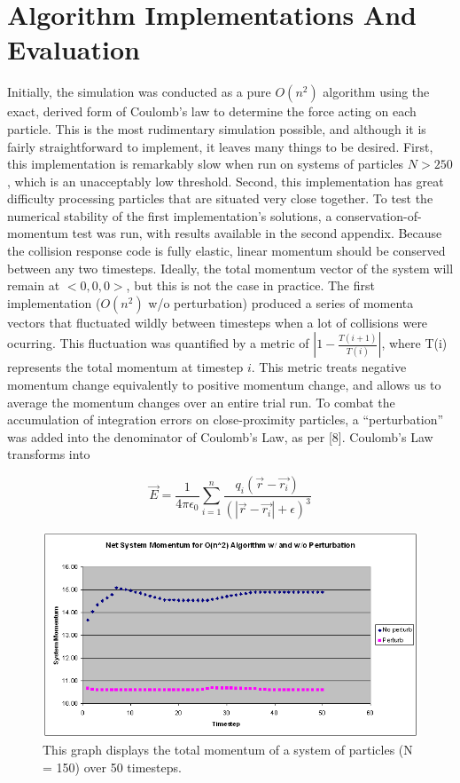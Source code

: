 \documentclass[10pt]{article}
\begin{document}
\section{Algorithm Implementations And Evaluation}
Initially, the simulation was conducted as a pure $O(n^2)$ algorithm using the exact, derived form of Coulomb's law to determine the force acting on each particle. This is the most rudimentary simulation possible, and although it is fairly straightforward to implement, it leaves many things to be desired. First, this implementation is remarkably slow when run on systems of particles $N > 250$, which is an unacceptably low threshold. Second, this implementation has great difficulty processing particles that are situated very close together. To test the numerical stability of the first implementation's solutions, a conservation-of-momentum test was run, with results available in the second appendix. Because the collision response code is fully elastic, linear momentum should be conserved between any two timesteps. Ideally, the total momentum vector of the system will remain at $<0, 0, 0>$, but this is not the case in practice. The first implementation ($O(n^2)$ w/o perturbation) produced a series of momenta vectors that fluctuated wildly between timesteps when a lot of collisions were ocurring. This fluctuation was quantified by a metric of $|1 - \frac{T(i+1)}{T(i)}|$, where T(i) represents the total momentum at timestep $i$. This metric treats negative momentum change equivalently to positive momentum change, and allows us to average the momentum changes over an entire trial run. To combat the accumulation of integration errors on close-proximity particles, a ``perturbation'' was added into the denominator of Coulomb's Law, as per [8]. Coulomb's Law transforms into

$$\vec{E} = \frac{1}{4\pi\epsilon_0}\sum_{i = 1}^n \frac{q_i (\vec{r} - \vec{r_i})}{(|\vec{r} - \vec{r_i}| + \epsilon)^3}$$ 

\begin{figure}[ht]
	\centering
		\includegraphics[scale = 0.75]{graphOfPerturbMomentum.PNG}
	\caption{This graph displays the total momentum of a system of particles (N = 150) over 50 timesteps.}
	\label{fig:graphOfPerturbMomentum}
\end{figure}
\end{document}
